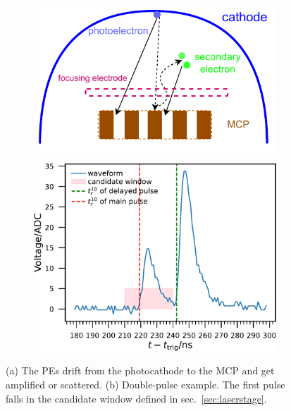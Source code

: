 \begin{figure}[!htbp]
    \centering
    \begin{subfigure}[t]{\SF\textwidth}
        \includegraphics[width=\textwidth]{figures/method/MCPelectron.pdf}
        \caption{}%
        \label{fig:mcpelectron}
    \end{subfigure}
    \begin{subfigure}[t]{\SF\textwidth}
        \includegraphics[width=\textwidth]{figures/method/triggerDoublePulse.pdf}
        \caption{}%
        \label{fig:triggerTT2pulse}
    \end{subfigure}
    \caption{(a) The PEs drift from the photocathode to the MCP and get amplified or scattered. (b) Double-pulse example. The first pulse falls in the candidate window defined in sec.~\ref{sec:laserstage}.}
\end{figure}

